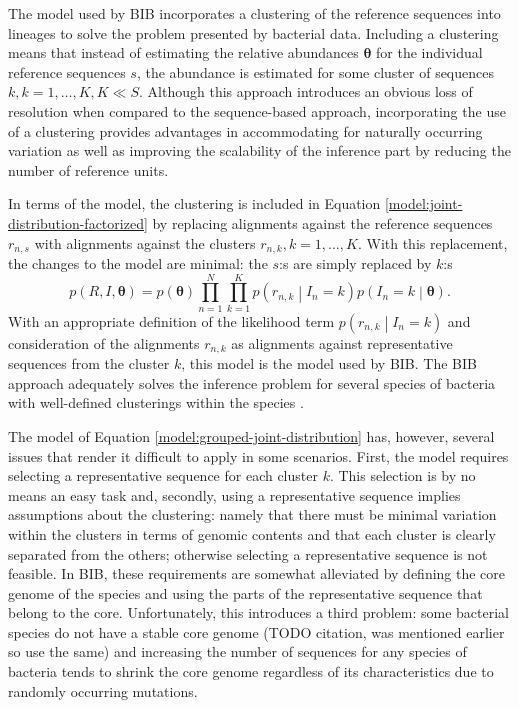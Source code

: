 \documentclass[officiallayout]{tktla}
\begin{document}
The model used by BIB incorporates a clustering of the reference
sequences into lineages to solve the problem presented by bacterial
data. Including a clustering means that instead of estimating the
relative abundances $\boldsymbol\theta$ for the individual reference
sequences $s$, the abundance is estimated for some cluster of
sequences $k, k = 1, \dots, K, K \ll S$. Although this approach
introduces an obvious loss of resolution when compared to the
sequence-based approach, incorporating the use of a clustering
provides advantages in accommodating for naturally occurring variation
as well as improving the scalability of the inference part by reducing
the number of reference units.

In terms of the model, the clustering is included in Equation
\ref{model:joint-distribution-factorized} by replacing alignments
against the reference sequences $r_{n, s}$ with alignments against the
clusters $r_{n, k}, k = 1, \dots, K$. With this replacement, the
changes to the model are minimal: the $s$:s are simply replaced by
$k$:s
\begin{equation}
  \label{model:grouped-joint-distribution}
  p\left(R, I, \boldsymbol\theta\right) = p\left(\boldsymbol\theta\right)\prod_{n = 1}^{N} \prod_{k = 1}^{K} p\left(r_{n, k} \middle| I_{n} = k\right) p\left(I_{n} = k \middle| \boldsymbol\theta\right).
\end{equation}
With an appropriate definition of the likelihood term $p\left(r_{n, k}
\middle| I_{n} = k\right)$ and consideration of the alignments $r_{n,
  k}$ as alignments against representative sequences from the cluster
$k$, this model is the model used by BIB. The BIB approach adequately
solves the inference problem for several species of bacteria with
well-defined clusterings within the species
\citep{sankar2016bayesian}.

The model of Equation \ref{model:grouped-joint-distribution} has,
however, several issues that render it difficult to apply in some
scenarios. First, the model requires selecting a representative
sequence for each cluster $k$. This selection is by no means an easy
task and, secondly, using a representative sequence implies
assumptions about the clustering: namely that there must be minimal
variation within the clusters in terms of genomic contents and that
each cluster is clearly separated from the others; otherwise selecting
a representative sequence is not feasible. In BIB, these requirements
are somewhat alleviated by defining the core genome of the species and
using the parts of the representative sequence that belong to the
core. Unfortunately, this introduces a third problem: some bacterial
species do not have a stable core genome (TODO citation, was mentioned
earlier so use the same) and increasing the number of sequences for
any species of bacteria tends to shrink the core genome regardless of
its characteristics due to randomly occurring mutations.
\end{document}
